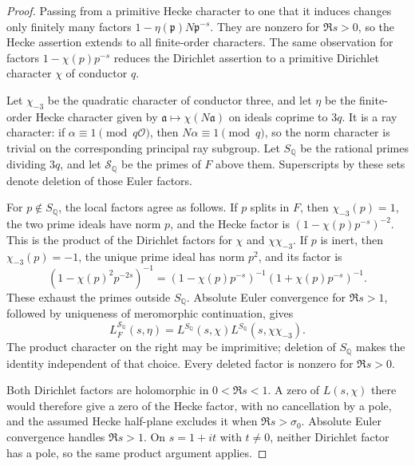 \documentclass[11pt,a4paper]{article}
\numberwithin{equation}{section}
\numberwithin{figure}{section}
\theoremstyle{definition}
\theoremstyle{remark}
\begin{document}
\begin{proof}
Passing from a primitive Hecke character to one that it induces changes
only finitely many factors $1-\eta(\mathfrak p)N\mathfrak p^{-s}$.
They are nonzero for $\Re s>0$, so the Hecke assertion extends to all
finite-order characters.  The same observation for factors
$1-\chi(p)p^{-s}$ reduces the Dirichlet assertion to a primitive
Dirichlet character $\chi$ of conductor $q$.

Let $\chi_{-3}$ be the quadratic character of conductor three, and let
$\eta$ be the finite-order Hecke character given by
$\mathfrak a\mapsto\chi(N\mathfrak a)$ on ideals coprime to $3q$.
It is a ray character: if $\alpha\equiv1\pmod{q\mathcal O}$, then
$N\alpha\equiv1\pmod q$, so the norm character is trivial on the
corresponding principal ray subgroup.  Let $S_{\mathbb Q}$ be the rational
primes dividing $3q$, and let $\mathcal S_{\mathbb Q}$ be the primes of
$F$ above them.  Superscripts by these sets denote deletion of those Euler
factors.

For $p\notin S_{\mathbb Q}$, the local factors agree as follows.  If $p$
splits in $F$, then $\chi_{-3}(p)=1$, the two prime ideals have norm $p$,
and the Hecke factor is $(1-\chi(p)p^{-s})^{-2}$.  This is the product of
the Dirichlet factors for $\chi$ and $\chi\chi_{-3}$.  If $p$ is inert,
then $\chi_{-3}(p)=-1$, the unique prime ideal has norm $p^2$, and its
factor is
\[
 (1-\chi(p)^2p^{-2s})^{-1}
  =(1-\chi(p)p^{-s})^{-1}(1+\chi(p)p^{-s})^{-1}.
\]
These exhaust the primes outside $S_{\mathbb Q}$.  Absolute Euler
convergence for $\Re s>1$, followed by uniqueness of meromorphic
continuation, gives
\begin{equation}
 L_F^{\mathcal S_{\mathbb Q}}(s,\eta)
 =L^{S_{\mathbb Q}}(s,\chi)
      L^{S_{\mathbb Q}}(s,\chi\chi_{-3}).
 \label{eq:hecke-dirichlet-factorization}
\end{equation}
The product character on the right may be imprimitive; deletion of
$S_{\mathbb Q}$ makes the identity independent of that choice.  Every
deleted factor is nonzero for $\Re s>0$.

Both Dirichlet factors are holomorphic in $0<\Re s<1$.  A zero of
$L(s,\chi)$ there would therefore give a zero of the Hecke factor, with
no cancellation by a pole, and the assumed Hecke half-plane excludes it
when $\Re s>\sigma_0$.  Absolute Euler convergence handles $\Re s>1$.
On $s=1+it$ with $t\ne0$, neither Dirichlet factor has a pole, so the same
product argument applies.


\end{proof}
\end{document}
